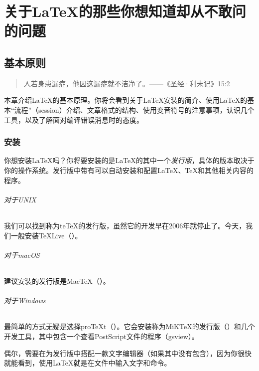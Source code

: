 \part{关于\LaTeX 的那些你想知道却从不敢问的问题}

\chapter{基本原则}
\begin{quote}
    人若身患漏症，他因这漏症就不洁净了。——《圣经·利未记》15:2
\end{quote}

本章介绍\LaTeX 的基本原理。你将会看到关于\LaTeX 安装的简介、使用\LaTeX 的基本“流程”（session）介绍、文章格式的结构、使用变音符号的注意事项，认识几个工具，以及了解面对编译错误消息时的态度。

\section{安装}

你想安装\LaTeX 吗？你将要安装的是\LaTeX 的其中一个\textit{发行版}，具体的版本取决于你的操作系统。发行版中带有可以自动安装和配置\LaTeX 、\TeX 和其他相关内容的程序。

\paragraph*{对于UNIX}我们可以找到称为te\TeX 的发行版，虽然它的开发早在2006年就停止了。今天，我们一般安装\TeX Live（）。

\paragraph*{对于macOS}建议安装的发行版是Mac\TeX（）。

\paragraph*{对于Windows}最简单的方式无疑是选择pro\TeX t（）。它会安装称为MiK\TeX 的发行版（）和几个开发工具，其中包含一个查看PostScript文件的程序（\textsf{gsview}）。

偶尔，需要在为发行版中搭配一款文字编辑器（如果其中没有包含），因为你很快就能看到，使用\LaTeX 就是在文件中输入文字和命令。

